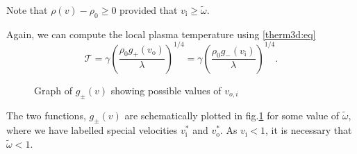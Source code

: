 \documentclass[12pt,a4paper]{article}
\newcommand{\prn}[1]{\left ( #1 \right )}
\newcommand{\rz}{\rho_0}
\newcommand{\tloc}{\mathcal{T}}
\newcommand{\vi}{v_\mathrm{i}}
\newcommand{\vo}{v_\mathrm{o}}
\newcommand{\tw}{\widetilde{\omega}}
\begin{document}
Note that $\rho(v)-\rz\geq 0$ provided that $\vi \geq \tw$.


Again, we can compute the local plasma temperature using
\eqref{therm3d:eq}
%
\begin{equation}\label{temploc2:eq}
  \tloc = \gamma\prn{\frac{\rz g_+(\vo)}{\lambda}}^{1/4}
        = \gamma\prn{\frac{\rz g_-(\vi)}{\lambda}}^{1/4}.
\end{equation}
%


\begin{figure}
%
  \begin{center}
    
  \caption{Graph of $g_\pm(v)$ showing possible values of $v_{o,i}$}\label{gpm:fig}
  \end{center}
\end{figure}

The two functions, $g_\pm(v)$ are schematically plotted in
fig.\ref{gpm:fig} for some value of $\tw$, where we have labelled
special velocities $\vi^*$ and $\vo^*$. As $\vi<1$, it is necessary
that $\tw<1$.
\end{document}
